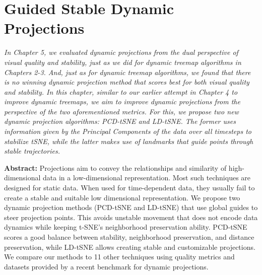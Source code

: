 \chapter{Guided Stable Dynamic Projections}
\label{ch:proj-algo}

\textit{
In Chapter 5, we evaluated dynamic projections from the dual perspective of visual quality and stability, just as we did for dynamic treemap algorithms in Chapters 2-3. And, just as for dynamic treemap algorithms, we found that there is no winning dynamic projection method that scores best for both visual quality and stability. In this chapter, similar to our earlier attempt in Chapter 4 to improve dynamic treemaps, we aim to improve dynamic projections from the perspective of the two aforementioned metrics.  For this, we propose two new dynamic projection algorithms: PCD-tSNE and LD-tSNE. The former uses information given by the Principal Components of the data over all timesteps to stabilize tSNE, while the latter makes use of landmarks that guide points through stable trajectories. 
}

\vspace{5mm} %


\noindent \textbf{Abstract:}
Projections aim to convey the relationships and similarity of high-dimensional data in a low-dimensional representation.
Most such techniques are designed for static data. When used for time-dependent data, they usually fail to create a stable and suitable low dimensional representation.
We propose two dynamic projection methods (PCD-tSNE and LD-tSNE) that use global guides to steer projection points. This avoids unstable movement that does not encode data dynamics while keeping t-SNE's neighborhood preservation ability. PCD-tSNE scores a good balance between stability, neighborhood preservation, and distance preservation, while LD-tSNE allows creating stable and customizable projections. We compare our methods to 11 other techniques using quality metrics and datasets provided by a recent benchmark for dynamic projections.
    
